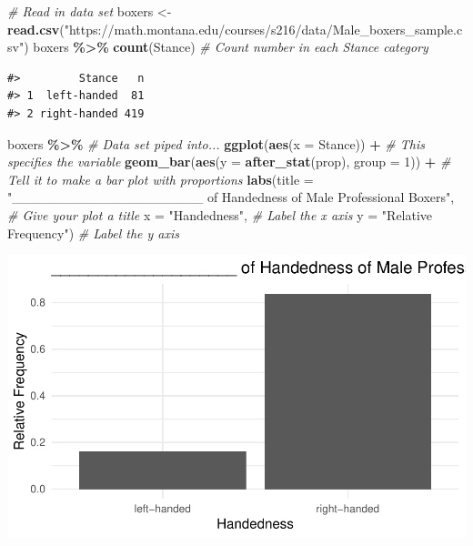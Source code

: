 \documentclass[
]{report}
\newenvironment{Shaded}{\begin{snugshade}}{\end{snugshade}}
\newcommand{\AttributeTok}[1]{\textcolor[rgb]{0.13,0.29,0.53}{#1}}
\newcommand{\CommentTok}[1]{\textcolor[rgb]{0.56,0.35,0.01}{\textit{#1}}}
\newcommand{\DecValTok}[1]{\textcolor[rgb]{0.00,0.00,0.81}{#1}}
\newcommand{\FunctionTok}[1]{\textcolor[rgb]{0.13,0.29,0.53}{\textbf{#1}}}
\newcommand{\NormalTok}[1]{#1}
\newcommand{\OtherTok}[1]{\textcolor[rgb]{0.56,0.35,0.01}{#1}}
\newcommand{\SpecialCharTok}[1]{\textcolor[rgb]{0.81,0.36,0.00}{\textbf{#1}}}
\newcommand{\StringTok}[1]{\textcolor[rgb]{0.31,0.60,0.02}{#1}}
\begin{document}
\begin{Shaded}
\begin{Highlighting}[]
 \CommentTok{\# Read in data set}
\NormalTok{boxers }\OtherTok{\textless{}{-}} \FunctionTok{read.csv}\NormalTok{(}\StringTok{"https://math.montana.edu/courses/s216/data/Male\_boxers\_sample.csv"}\NormalTok{)}
\NormalTok{boxers }\SpecialCharTok{\%\textgreater{}\%} \FunctionTok{count}\NormalTok{(Stance)  }\CommentTok{\# Count number in each Stance category}
\end{Highlighting}
\end{Shaded}

\begin{verbatim}
#>         Stance   n
#> 1  left-handed  81
#> 2 right-handed 419
\end{verbatim}

\newpage

\begin{Shaded}
\begin{Highlighting}[]
\NormalTok{boxers }\SpecialCharTok{\%\textgreater{}\%} \CommentTok{\# Data set piped into...}
    \FunctionTok{ggplot}\NormalTok{(}\FunctionTok{aes}\NormalTok{(}\AttributeTok{x =}\NormalTok{ Stance)) }\SpecialCharTok{+}   \CommentTok{\# This specifies the variable}
    \FunctionTok{geom\_bar}\NormalTok{(}\FunctionTok{aes}\NormalTok{(}\AttributeTok{y =} \FunctionTok{after\_stat}\NormalTok{(prop), }\AttributeTok{group =} \DecValTok{1}\NormalTok{)) }\SpecialCharTok{+}  \CommentTok{\# Tell it to make a bar plot with proportions}
    \FunctionTok{labs}\NormalTok{(}\AttributeTok{title =} \StringTok{"\_\_\_\_\_\_\_\_\_\_\_\_\_\_\_\_\_\_\_\_ of Handedness of Male Professional Boxers"}\NormalTok{,  }
       \CommentTok{\# Give your plot a title}
       \AttributeTok{x =} \StringTok{"Handedness"}\NormalTok{,   }\CommentTok{\# Label the x axis}
       \AttributeTok{y =} \StringTok{"Relative Frequency"}\NormalTok{)  }\CommentTok{\# Label the y axis}
\end{Highlighting}
\end{Shaded}

\begin{center}\includegraphics[width=0.5\linewidth]{04-A09-inference-1cat-theory_files/figure-latex/unnamed-chunk-2-1} \end{center}
\end{document}
